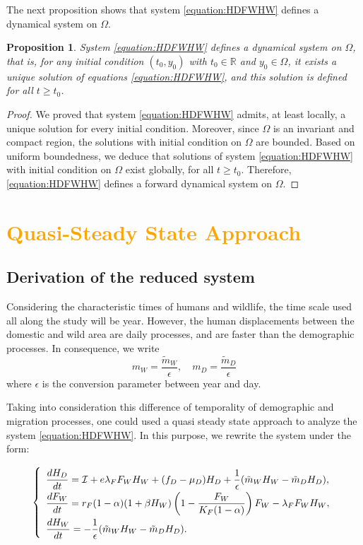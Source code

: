 \documentclass{article}
\newcommand{\lfw}{\lambda_{F}}
\newcommand{\lfw}{\lambda_{F}}
\newcommand{\cI}{\mathcal{I}}
\newcommand{\mW}{\tilde{m}_W}
\newcommand{\mD}{\tilde{m}_D}
\newcommand{\vdeux}[1]{\textcolor{orange}{#1}}
\newtheorem{prop}[theorem]{Proposition}
\theoremstyle{definition}
\theoremstyle{remark}
\begin{document}
The next proposition shows that system \eqref{equation:HDFWHW} defines a dynamical system on $\Omega$.

\begin{prop}
System \eqref{equation:HDFWHW} defines a dynamical system on $\Omega$, that is, for any initial condition $(t_0, y_0)$ with $t_0 \in \mathbb{R}$ and $y_0 \in \Omega$, it exists a unique solution of equations \eqref{equation:HDFWHW}, and this solution is defined for all $t \geq t_0$.
\end{prop}

\begin{proof}
We proved that system \eqref{equation:HDFWHW} admits, at least locally, a unique solution for every initial condition. Moreover, since $\Omega$ is an invariant and compact region, the solutions with initial condition on $\Omega$ are bounded. Based on uniform boundedness, we deduce that solutions of system \eqref{equation:HDFWHW} with initial condition on $\Omega$ exist globally, for all $t\geq t_0$. Therefore, \eqref{equation:HDFWHW} defines a forward dynamical system on $\Omega$.
\end{proof}

\section{\vdeux{Quasi-Steady State Approach}} \label{sec:qssa}
\subsection{Derivation of the reduced system}

Considering the characteristic times of humans and wildlife, the time scale used all along the study will be year. However, the human displacements between the domestic and wild area are daily processes, and are faster than the demographic processes. In consequence, we write $$m_W = \dfrac{\mW}{\epsilon}, \quad m_D = \dfrac{\mD}{\epsilon}$$ where $\epsilon$ is the conversion parameter between year and day. 

Taking into consideration this difference of temporality of demographic and migration processes, one could used a quasi steady state approach to analyze the system \eqref{equation:HDFWHW}. In this purpose, we rewrite the system under the form:

\begin{equation}
\def\arraystretch{2}
\left\{ 
\begin{array}{l}
\dfrac{dH_D}{dt}= \cI + e\lfw F_WH_W + (f_D - \mu_D) H_D + \dfrac{1}{\epsilon}(\mW H_W - \mD H_D), \\
\dfrac{dF_W}{dt} = r_F(1- \alpha) (1+ \beta H_W) \left(1 - \dfrac{F_W}{K_F(1-\alpha)} \right) F_W - \lfw F_WH_W, \\
\dfrac{dH_W}{dt}= - \dfrac{1}{\epsilon}(\mW H_W - \mD H_D).
\end{array} \right.
\label{equation:HDFWHW, fast}
\end{equation}
\end{document}
